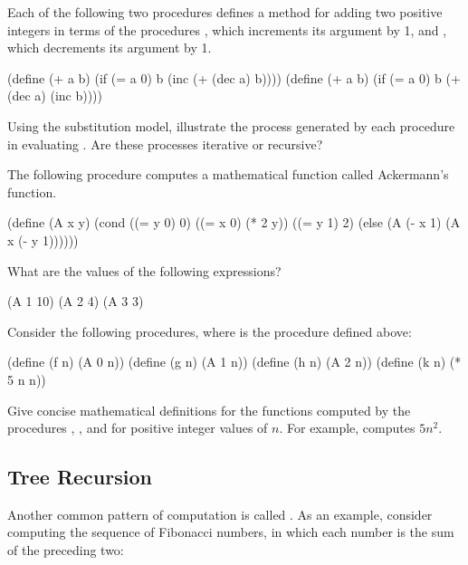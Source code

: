 \begin{exerciseGroup}
\label{Exercise 1.9}
 Each of the following two
procedures defines a method for adding two positive integers in terms of the
procedures , which increments its argument by 1, and ,
which decrements its argument by 1.

\begin{codeBlock}
(define (+ a b)
  (if (= a 0) b (inc (+ (dec a) b))))
(define (+ a b)
  (if (= a 0) b (+ (dec a) (inc b))))
\end{codeBlock}

Using the substitution model, illustrate the process generated by each
procedure in evaluating .  Are these processes iterative or
recursive?

\label{Exercise 1.10}
 The following procedure computes
a mathematical function called Ackermann's function.

\begin{codeBlock}
(define (A x y)
  (cond ((= y 0) 0)
        ((= x 0) (* 2 y))
        ((= y 1) 2)
        (else (A (- x 1) (A x (- y 1))))))
\end{codeBlock}

What are the values of the following expressions?

\begin{codeBlock}
(A 1 10)
(A 2 4)
(A 3 3)
\end{codeBlock}

Consider the following procedures, where  is the procedure
defined above:

\begin{codeBlock}
(define (f n) (A 0 n))
(define (g n) (A 1 n))
(define (h n) (A 2 n))
(define (k n) (* 5 n n))
\end{codeBlock}

Give concise mathematical definitions for the functions computed by the
procedures , , and  for positive integer values of
\( n \).  For example,  computes \( 5n^2 \).
\end{exerciseGroup}

\subsection{Tree Recursion}
\label{Section 1.2.2}

Another common pattern of computation is called .  As
an example, consider computing the sequence of Fibonacci numbers, in which each
number is the sum of the preceding two:

